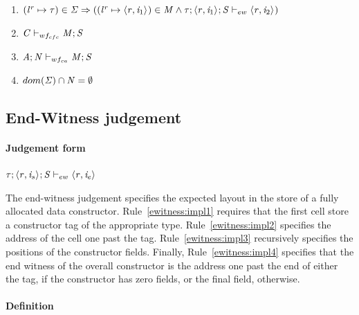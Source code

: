 \documentclass[showabstract,showacknowledgments,showpreface,showdedication]{iuphd}
\theoremstyle{nonumberplain}
\begin{document}
\begin{enumerate}

    \item \label{wf:map-store-consistency} $ ({\mathit{l}}^{\mathit{r}} \mapsto \mathit{\tau}) \in \mathit{\Sigma} \Rightarrow \\
            (({\mathit{l}}^{\mathit{r}} \mapsto \langle \mathit{r}, \mathit{i}_1 \rangle ^{}) \in \mathit{M} \wedge \\
            \mathit{\tau};\langle \mathit{r}, \mathit{i}_1 \rangle ^{};\mathit{S} \vdash_{ew} \langle \mathit{r}, \mathit{i}_2 \rangle ^{})
          $ 

    \item \label{wf:cfc} $\mathit{C} \vdash_{wf_{cfc}} \mathit{M};\mathit{S}$ 

    \item \label{wf:ca} $\mathit{A};\mathit{N} \vdash_{wf_{ca}} \mathit{M};\mathit{S}$

    \item \label{wf:impl1} $dom(\mathit{\Sigma}) \cap \mathit{N} = \emptyset $
\end{enumerate}

\subsection{End-Witness judgement}
\label{sec:end-witness}

\paragraph{Judgement form}

$\mathit{\tau};\langle \mathit{r}, \mathit{i}_{s} \rangle ^{};\mathit{S} \vdash_{ew} \langle \mathit{r}, \mathit{i}_{e} \rangle ^{}$

The end-witness judgement specifies the expected layout in the store of a fully
allocated data constructor.
%
Rule~\ref{ewitness:impl1} requires that the first cell store a constructor
tag of the appropriate type.
%
Rule~\ref{ewitness:impl2} specifies the address of the cell one past the tag.
%
Rule~\ref{ewitness:impl3} recursively specifies the positions of the constructor
fields.
%
Finally, Rule~\ref{ewitness:impl4} specifies that the end witness of
the overall constructor is the address one past the end of either the
tag, if the constructor has zero fields, or the final field,
otherwise.

\paragraph{Definition}
\end{document}
